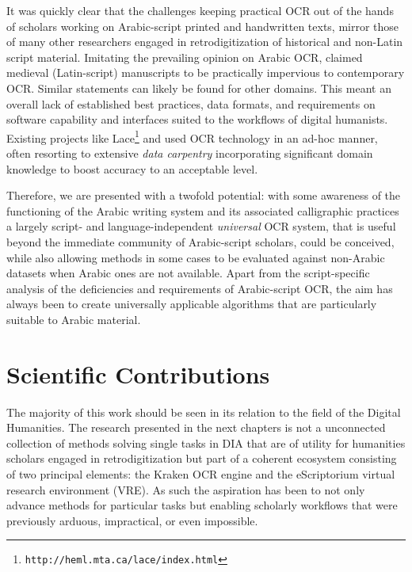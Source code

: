 It was quickly clear that the challenges keeping practical OCR out of the hands
of scholars working on Arabic-script printed and handwritten texts, mirror
those of many other researchers engaged in retrodigitization of historical and
non-Latin script material. Imitating the prevailing opinion on Arabic OCR,
\cite{widner2017toward} claimed medieval (Latin-script) manuscripts to be
practically impervious to contemporary OCR. Similar statements can likely be
found for other domains. This meant an overall lack of established best
practices, data formats, and requirements on software capability and interfaces
suited to the workflows of digital humanists. Existing projects like
Lace\footnote{\texttt{http://heml.mta.ca/lace/index.html}} and
\cite{alpert2016machine} used OCR technology in an ad-hoc manner, often
resorting to extensive \emph{data carpentry}\cite{carpentry} incorporating
significant domain knowledge to boost accuracy to an acceptable level.

Therefore, we are presented with a twofold potential: with some awareness of
the functioning of the Arabic writing system and its associated calligraphic
practices a largely script- and language-independent \emph{universal} OCR
system, that is useful beyond the immediate community of Arabic-script
scholars, could be conceived, while also allowing methods in some cases to be
evaluated against non-Arabic datasets when Arabic ones are not available. Apart
from the script-specific analysis of the deficiencies and requirements of
Arabic-script OCR, the aim has always been to create universally applicable
algorithms that are particularly suitable to Arabic material.

\section{Scientific Contributions}

The majority of this work should be seen in its relation to the field of the
Digital Humanities. The research presented in the next chapters is not a
unconnected collection of methods solving single tasks in DIA that are of
utility for humanities scholars engaged in retrodigitization but part of a
coherent ecosystem consisting of two principal elements: the Kraken OCR engine
and the eScriptorium virtual research environment (VRE). As such the aspiration
has been to not only advance methods for particular tasks but enabling
scholarly workflows that were previously arduous, impractical, or even
impossible.

